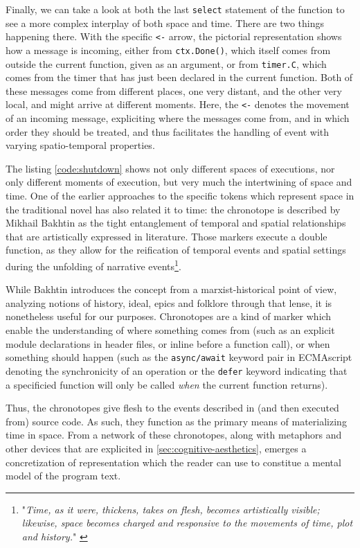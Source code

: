 Finally, we can take a look at both the last \lstinline{select} statement of the function to see a more complex interplay of both space and time. There are two things happening there. With the specific \lstinline{<-} arrow, the pictorial representation shows how a message is incoming, either from \lstinline{ctx.Done()}, which itself comes from outside the current function, given as an argument, or from \lstinline{timer.C}, which comes from the timer that has just been declared in the current function. Both of these messages come from different places, one very distant, and the other very local, and might arrive at different moments. Here, the \lstinline{<-} denotes the movement of an incoming message, expliciting where the messages come from, and in which order they should be treated, and thus facilitates the handling of event with varying spatio-temporal properties.

The listing \ref{code:shutdown} shows not only different spaces of executions, nor only different moments of execution, but very much the intertwining of space and time. One of the earlier approaches to the specific tokens which represent space in the traditional novel has also related it to time: the chronotope is described by Mikhail Bakhtin as the tight entanglement of temporal and spatial relationships that are artistically expressed in literature. Those markers execute a double function, as they allow for the reification of temporal events and spatial settings during the unfolding of narrative events\footnote{"\emph{Time, as it were, thickens, takes on flesh, becomes artistically visible; likewise, space becomes charged and responsive to the movements of time, plot and history.}" \citep{bakhtin_dialogic_1981}}. 

While Bakhtin introduces the concept from a marxist-historical point of view, analyzing notions of history, ideal, epics and folklore through that lense, it is nonetheless useful for our purposes. Chronotopes are a kind of marker which enable the understanding of where something comes from (such as an explicit module declarations in header files, or inline before a function call), or when something should happen (such as the \lstinline{async/await} keyword pair in ECMAscript denoting the synchronicity of an operation or the \lstinline{defer} keyword indicating that a specificied function will only be called \emph{when} the current function returns).

Thus, the chronotopes give flesh to the events described in (and then executed from) source code. As such, they function as the primary means of materializing time in space. From a network of these chronotopes, along with metaphors and other devices that are explicited in \ref{sec:cognitive-aesthetics}, emerges a concretization of representation which the reader can use to constitue a mental model of the program text.

